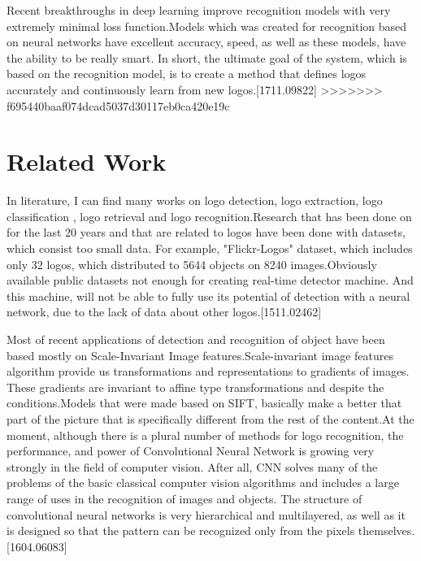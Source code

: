 \vspace{-0.5cm}
\par Recent breakthroughs in deep learning improve recognition models with very extremely minimal loss function.Models which was created for recognition based on neural networks have excellent accuracy, speed, as well as these models, have the ability to be really smart. In short, the ultimate goal of the system, which is based on the recognition model, is to create a method that defines logos accurately and continuously learn from new logos.[1711.09822]
>>>>>>> f695440baaf074dcad5037d30117eb0ca420e19c

\vspace{-0.3cm}
\section{Related Work}\label{sec:1.2}
\vspace{-0.5cm}
\noindent In literature, I can find many works on logo detection, logo extraction, logo classification , logo retrieval and logo recognition.Research that has been done on for the last 20 years and that are related to logos have been done with datasets, which consist too small data. For example, "Flickr-Logos" dataset, which includes only 32 logos, which distributed to 5644 objects on 8240 images.Obviously available public datasets not enough for creating real-time detector machine. And this machine, will not be able to fully use its potential of detection with a neural network, due to the lack of data about other logos.[1511.02462]

\vspace{-0.3cm}
\par Most of recent applications of detection and recognition of object have been based mostly on Scale-Invariant Image features.Scale-invariant image features algorithm provide us transformations and representations to gradients of images. These gradients are invariant to affine type transformations and despite the conditions.Models that were made based on SIFT, basically make a better that part of the picture that is specifically different from the rest of the content.At the moment, although there is a plural number of methods for logo recognition, the performance, and power of Convolutional Neural Network is growing very strongly in the field of computer vision. After all, CNN solves many of the problems of the basic classical computer vision algorithms and includes a large range of uses in the recognition of images and objects. The structure of convolutional neural networks is very hierarchical and multilayered, as well as it is designed so that the pattern can be recognized only from the pixels themselves.[1604.06083]



